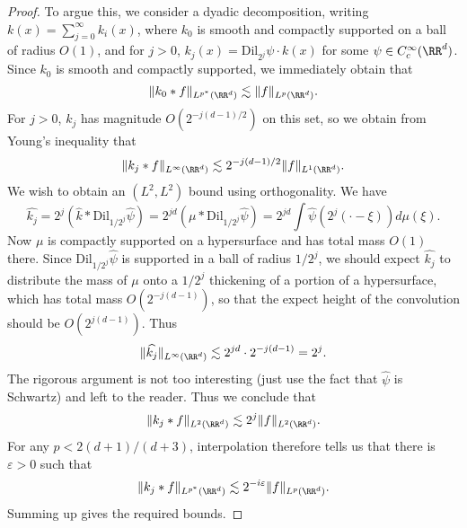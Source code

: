 \begin{proof}
  To argue this, we consider a dyadic decomposition, writing $k(x) = \sum_{j = 0}^\infty k_i(x)$, where $k_0$ is smooth and compactly supported on a ball of radius $O(1)$, and for $j > 0$, $k_j(x) = \text{Dil}_{2^j} \psi \cdot k(x)$ for some $\psi \in C_c^\infty(\RR^d)$. Since $k_0$ is smooth and compactly supported, we immediately obtain that
  \[ \| k_0 * f \|_{L^{p^*}(\RR^d)} \lesssim \| f \|_{L^p(\RR^d)}. \]
  For $j > 0$, $k_j$ has magnitude $O(2^{-j(d-1)/2})$ on this set, so we obtain from Young's inequality that
  \[ \| k_j * f \|_{L^\infty(\RR^d)} \lesssim 2^{-j(d-1)/2} \| f \|_{L^1(\RR^d)}. \]
  We wish to obtain an $(L^2,L^2)$ bound using orthogonality. We have
  \[ \widehat{k_j} = 2^j (\widehat{k} * \text{Dil}_{1/2^j} \widehat{\psi}) = 2^{jd} (\mu * \text{Dil}_{1/2^j} \widehat{\psi}) = 2^{jd} \int \widehat{\psi}(2^j (\cdot - \xi)) d\mu(\xi). \]
  Now $\mu$ is compactly supported on a hypersurface and has total mass $O(1)$ there. Since $\text{Dil}_{1/2^j} \widehat{\psi}$ is supported in a ball of radius $1/2^j$, we should expect $\widehat{k_j}$ to distribute the mass of $\mu$ onto a $1/2^j$ thickening of a portion of a hypersurface, which has total mass $O(2^{-j(d-1)})$, so that the expect height of the convolution should be $O(2^{j(d-1)})$. Thus
  \[ \| \widehat{k_j} \|_{L^\infty(\RR^d)} \lesssim 2^{jd} \cdot 2^{-j(d-1)} = 2^j. \]
  The rigorous argument is not too interesting (just use the fact that $\widehat{\psi}$ is Schwartz) and left to the reader. Thus we conclude that
  \[ \| k_j * f \|_{L^2(\RR^d)} \lesssim 2^j \| f \|_{L^2(\RR^d)}. \]
  For any $p < 2(d+1)/(d+3)$, interpolation therefore tells us that there is $\varepsilon > 0$ such that
  \[ \| k_j * f \|_{L^{p^*}(\RR^d)} \lesssim 2^{-i \varepsilon} \| f \|_{L^p(\RR^d)}. \]
  Summing up gives the required bounds.
\end{proof}

